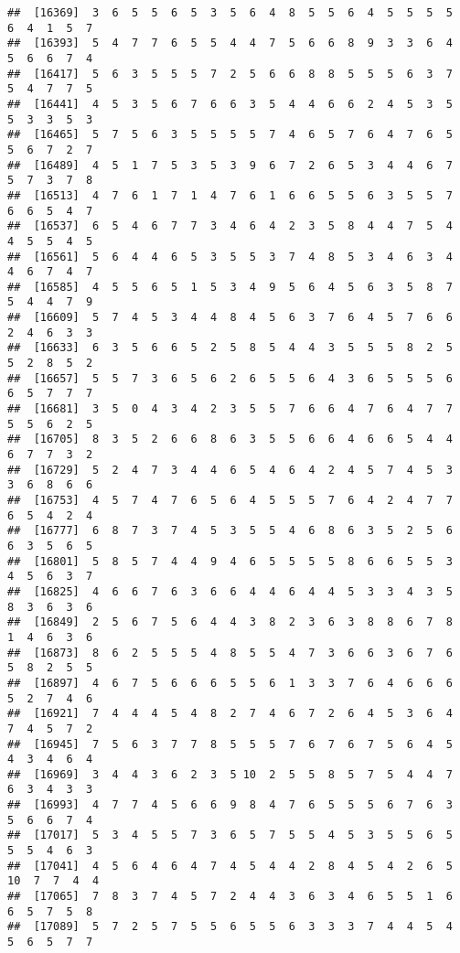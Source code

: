 \documentclass[
]{book}
\begin{document}
\begin{verbatim}
##  [16369]  3  6  5  5  6  5  3  5  6  4  8  5  5  6  4  5  5  5  5  6  4  1  5  7
##  [16393]  5  4  7  7  6  5  5  4  4  7  5  6  6  8  9  3  3  6  4  5  6  6  7  4
##  [16417]  5  6  3  5  5  5  7  2  5  6  6  8  8  5  5  5  6  3  7  5  4  7  7  5
##  [16441]  4  5  3  5  6  7  6  6  3  5  4  4  6  6  2  4  5  3  5  5  3  3  5  3
##  [16465]  5  7  5  6  3  5  5  5  5  7  4  6  5  7  6  4  7  6  5  5  6  7  2  7
##  [16489]  4  5  1  7  5  3  5  3  9  6  7  2  6  5  3  4  4  6  7  5  7  3  7  8
##  [16513]  4  7  6  1  7  1  4  7  6  1  6  6  5  5  6  3  5  5  7  6  6  5  4  7
##  [16537]  6  5  4  6  7  7  3  4  6  4  2  3  5  8  4  4  7  5  4  4  5  5  4  5
##  [16561]  5  6  4  4  6  5  3  5  5  3  7  4  8  5  3  4  6  3  4  4  6  7  4  7
##  [16585]  4  5  5  6  5  1  5  3  4  9  5  6  4  5  6  3  5  8  7  5  4  4  7  9
##  [16609]  5  7  4  5  3  4  4  8  4  5  6  3  7  6  4  5  7  6  6  2  4  6  3  3
##  [16633]  6  3  5  6  6  5  2  5  8  5  4  4  3  5  5  5  8  2  5  5  2  8  5  2
##  [16657]  5  5  7  3  6  5  6  2  6  5  5  6  4  3  6  5  5  5  6  6  5  7  7  7
##  [16681]  3  5  0  4  3  4  2  3  5  5  7  6  6  4  7  6  4  7  7  5  5  6  2  5
##  [16705]  8  3  5  2  6  6  8  6  3  5  5  6  6  4  6  6  5  4  4  6  7  7  3  2
##  [16729]  5  2  4  7  3  4  4  6  5  4  6  4  2  4  5  7  4  5  3  3  6  8  6  6
##  [16753]  4  5  7  4  7  6  5  6  4  5  5  5  7  6  4  2  4  7  7  6  5  4  2  4
##  [16777]  6  8  7  3  7  4  5  3  5  5  4  6  8  6  3  5  2  5  6  6  3  5  6  5
##  [16801]  5  8  5  7  4  4  9  4  6  5  5  5  5  8  6  6  5  5  3  4  5  6  3  7
##  [16825]  4  6  6  7  6  3  6  6  4  4  6  4  4  5  3  3  4  3  5  8  3  6  3  6
##  [16849]  2  5  6  7  5  6  4  4  3  8  2  3  6  3  8  8  6  7  8  1  4  6  3  6
##  [16873]  8  6  2  5  5  5  4  8  5  5  4  7  3  6  6  3  6  7  6  5  8  2  5  5
##  [16897]  4  6  7  5  6  6  6  5  5  6  1  3  3  7  6  4  6  6  6  5  2  7  4  6
##  [16921]  7  4  4  4  5  4  8  2  7  4  6  7  2  6  4  5  3  6  4  7  4  5  7  2
##  [16945]  7  5  6  3  7  7  8  5  5  5  7  6  7  6  7  5  6  4  5  4  3  4  6  4
##  [16969]  3  4  4  3  6  2  3  5 10  2  5  5  8  5  7  5  4  4  7  6  3  4  3  3
##  [16993]  4  7  7  4  5  6  6  9  8  4  7  6  5  5  5  6  7  6  3  5  6  6  7  4
##  [17017]  5  3  4  5  5  7  3  6  5  7  5  5  4  5  3  5  5  6  5  5  5  4  6  3
##  [17041]  4  5  6  4  6  4  7  4  5  4  4  2  8  4  5  4  2  6  5 10  7  7  4  4
##  [17065]  7  8  3  7  4  5  7  2  4  4  3  6  3  4  6  5  5  1  6  6  5  7  5  8
##  [17089]  5  7  2  5  7  5  5  6  5  5  6  3  3  3  7  4  4  5  4  5  6  5  7  7

\end{verbatim}
\end{document}
